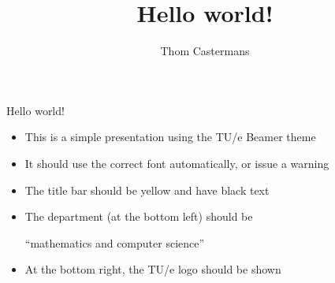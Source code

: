 \documentclass[12pt, aspectratio=169]{beamer} %
\title{Hello world!}
\author{Thom Castermans}
\begin{document}
\begin{titleframe}
\end{titleframe}

\begin{frame}{Hello world!}
  \begin{itemize}
    \item This is a simple presentation using the TU/e Beamer theme
    \item It should use the correct font automatically, or issue a warning
    \item The title bar should be yellow and have black text
    \item The department (at the bottom left) should be
          
          ``mathematics and computer science''
    \item At the bottom right, the TU/e logo should be shown
  \end{itemize}
\end{frame}
\end{document}
